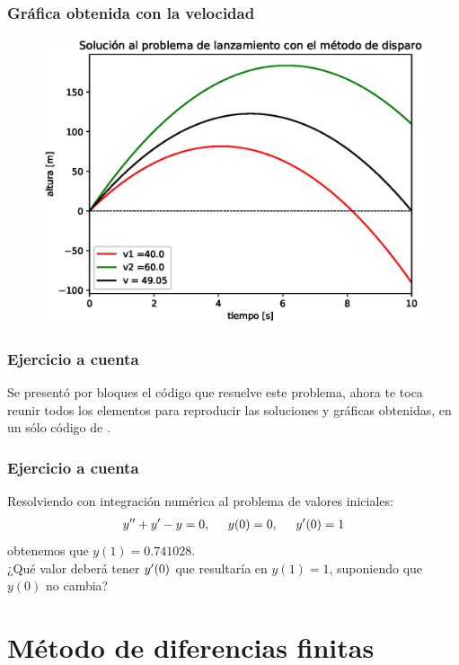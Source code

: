 \begin{frame}
\frametitle{Gráfica obtenida con la velocidad}
\begin{figure}[h!]
    \centering
    \includegraphics[scale=0.55]{Imagenes/metodo_disparo_2020_02.eps}
\end{figure}
\end{frame}
\begin{frame}
\frametitle{Ejercicio a cuenta}
Se presentó por bloques el código que resuelve este problema, ahora te toca reunir todos los elementos para reproducir las soluciones y gráficas obtenidas, en un sólo código de \python.
\end{frame}
\begin{frame}
\frametitle{Ejercicio a cuenta}
Resolviendo con integración numérica al problema de valores iniciales:
\begin{align*}
{y}^{\prime \prime} + {y}^{\prime} - y = 0, \hspace{0.5cm} y(0) = 0, \hspace{0.5cm} {y}^{\prime}(0) = 1
\end{align*}
obtenemos que $y(1) = 0.741028$. 
\\
\bigskip
¿Qué valor deberá tener ${y}^{\prime}(0)$ que resultaría en $y(1) = 1$, suponiendo que $y(0)$ no cambia?
\end{frame}
\section{Método de diferencias finitas}
